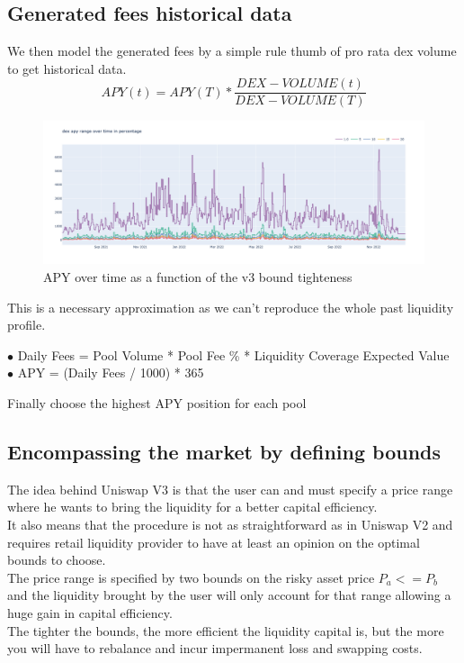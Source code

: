 \documentclass[conference]{IEEEtran}
\begin{document}
\subsection{Generated fees historical data}
We then model the generated fees by a simple rule thumb of pro rata dex volume to get historical data.
\begin{equation}
APY\left(t\right) = APY\left(T\right) * \frac{DEX-VOLUME\left(t\right)}{DEX-VOLUME\left(T\right)}
\end{equation}
\begin{figure}[h!]
    \centering
    \includegraphics[scale=0.15]{Plots/apy_over_time_ETH.png}
    \caption{APY over time as a function of the v3 bound tighteness}
    \label{fig:apy_over_time}
\end{figure}
This is a necessary approximation as we can't reproduce the whole past liquidity profile.\\

\begin{description}
  \item[$\bullet$ Daily Fees = Pool Volume * Pool Fee \% * Liquidity Coverage Expected Value]
  \item[$\bullet$ APY = (Daily Fees / 1000) * 365\\]
\end{description}
Finally choose the highest APY position for each pool
\subsection{Encompassing the market by defining bounds}
The idea behind Uniswap V3 is that the user can and must specify a price range where he wants to bring the liquidity for a better capital efficiency.
\\
It also means that the procedure is not as straightforward as in Uniswap V2 and requires retail liquidity provider to have at least an opinion on the optimal bounds to choose.\\
The price range is specified by two bounds on the risky asset price $P_a <= P_b$ and the liquidity brought by the user will only account for that range allowing a huge gain in capital efficiency.\\
The tighter the bounds, the more efficient the liquidity capital is, but the more you will have to rebalance and incur impermanent loss and swapping costs.\\
\end{document}
